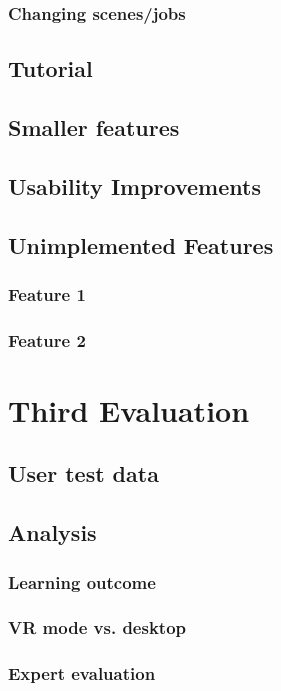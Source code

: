 \subsubsection{Changing scenes/jobs}
\subsection{Tutorial}


\subsection{Smaller features}


\subsection{Usability Improvements}


\subsection{Unimplemented Features}
\subsubsection{Feature 1}
\subsubsection{Feature 2}


\section{Third Evaluation}


\subsection{User test data}






\subsection{Analysis}

\subsubsection{Learning outcome}

\subsubsection{VR mode vs. desktop}

\subsubsection{Expert evaluation}


\cleardoublepage